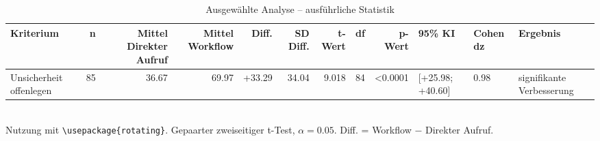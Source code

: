 \begin{table}
\centering
\caption{Ausgewählte Analyse -- ausführliche Statistik}
\begin{tabular}{lrrrrrrrrlll}
\toprule
Kriterium & n & Mittel Direkter Aufruf & Mittel Workflow & Diff. & SD Diff. & t-Wert & df & p-Wert & 95\% KI & Cohen dz & Ergebnis \\
\midrule
Unsicherheit offenlegen & 85 & 36.67 & 69.97 & +33.29 & 34.04 & 9.018 & 84 & <0.0001 & [+25.98; +40.60] & 0.98 & signifikante Verbesserung \\
\bottomrule
\end{tabular}
\\[2mm]
\footnotesize Nutzung mit \texttt{\textbackslash usepackage\{rotating\}}. Gepaarter zweiseitiger t-Test, $\alpha=0.05$. Diff. = Workflow $-$ Direkter Aufruf.
\end{table}
